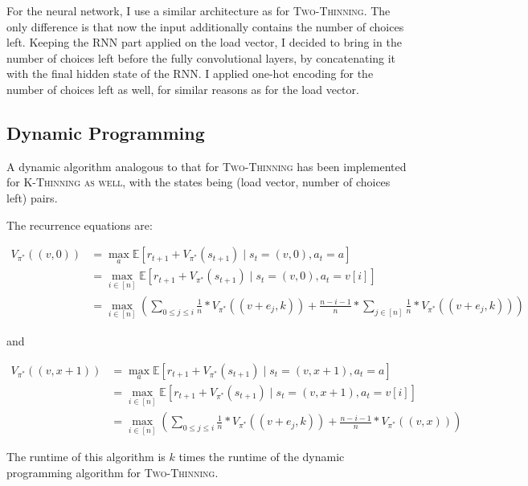 For the neural network, I use a similar architecture as for \textsc{Two-Thinning}. The only difference is that now the input additionally contains the number of choices left. Keeping the RNN part applied on the load vector, I decided to bring in the number of choices left before the fully convolutional layers, by concatenating it with the final hidden state of the RNN. I applied one-hot encoding for the number of choices left as well, for similar reasons as for the load vector.


\subsection{Dynamic Programming}


A dynamic algorithm analogous to that for \textsc{Two-Thinning} has been implemented for \textsc{K-Thinning as well}, with the states being (load vector, number of choices left) pairs.


The recurrence equations are:


\begin{equation} \label{eq:kthinning-dynamicprogramming-0left}
\begin{split}
    V_{\pi^*}((v, 0)) &= \max_a \mathbb{E} [r_{t+1} + V_{\pi^*}(s_{t+1}) \mid s_t=(v,0), a_t=a] \\
    &= \max_{i \in [n]} \mathbb{E} [r_{t+1} + V_{\pi^*}(s_{t+1}) \mid s_t=(v,0), a_t=v[i]] \\
    &= \max_{i \in [n]} (\sum_{0\leq j \leq i} \frac{1}{n}*V_{\pi^*}((v+e_j,k)) + \frac{n-i-1}{n} * \sum_{j \in [n]} \frac{1}{n}*V_{\pi^*}((v+e_j,k)))
\end{split}
\end{equation}


and 


\begin{equation} \label{eq:kthinning-dynamicprogramming-xleft}
\begin{split}
    V_{\pi^*}((v, x+1)) &= \max_a \mathbb{E} [r_{t+1} + V_{\pi^*}(s_{t+1}) \mid s_t=(v,x+1), a_t=a] \\
    &= \max_{i \in [n]} \mathbb{E} [r_{t+1} + V_{\pi^*}(s_{t+1}) \mid s_t=(v, x+1), a_t=v[i]] \\
    &= \max_{i \in [n]} (\sum_{0\leq j \leq i} \frac{1}{n}*V_{\pi^*}((v+e_j,k)) + \frac{n-i-1}{n} * V_{\pi^*}((v, x)))
\end{split}
\end{equation}

The runtime of this algorithm is $k$ times the runtime of the dynamic programming algorithm for \textsc{Two-Thinning}.


